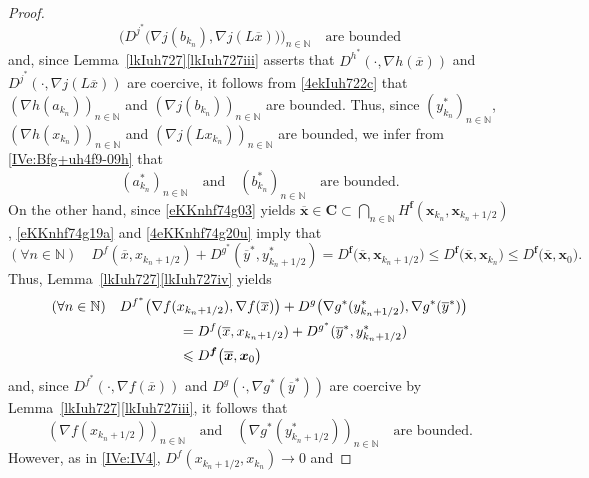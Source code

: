 \documentclass[a4paper,11pt,fleqn]{article}
\renewcommand{\leq}{\ensuremath{\leqslant}}
\newcommand{\NN}{\ensuremath{\mathbb N}}
\theoremstyle{plain}{\theorembodyfont{\rmfamily}%
\newtheorem{conjecture}[theorem]{Conjecture}}
\theoremstyle{plain}{\theorembodyfont{\rmfamily}%
\newtheorem{example}[theorem]{Example}}
\theoremstyle{plain}{\theorembodyfont{\rmfamily}%
\newtheorem{remark}[theorem]{Remark}}
\theoremstyle{plain}{\theorembodyfont{\rmfamily}%
\newtheorem{algorithm}[theorem]{Algorithm}}
\theoremstyle{plain}{\theorembodyfont{\rmfamily}%
\newtheorem{condition}[theorem]{Condition}}
\theoremstyle{plain}{\theorembodyfont{\rmfamily}%
\newtheorem{definition}[theorem]{Definition}}
\theoremstyle{plain}{\theorembodyfont{\rmfamily}
\newtheorem{problem}[theorem]{Problem}}
\theoremstyle{plain}{\theorembodyfont{\rmfamily}
\newtheorem{notation}[theorem]{Notation}}
\numberwithin{equation}{section}
\begin{document}
\begin{proof}
\begin{equation}
\Big(D^{j^*}\big(\nabla j(b_{k_n}),
\nabla j(L\overline{x})\big)\Big)_{n\in\NN}
\quad\text{are bounded}
\end{equation}
and, since Lemma~\ref{lkIuh727}\ref{lkIuh727iii} asserts 
that $D^{h^*}(\cdot,\nabla h(\overline{x}))$ 
and $D^{j^*}(\cdot,\nabla j(L\overline{x}))$ are coercive, 
it follows from \eqref{4ekIuh722c} that 
$(\nabla h(a_{k_n}))_{n\in\NN}$ 
and $(\nabla j(b_{k_n}))_{n\in\NN}$ are bounded. 
Thus, since $(y^*_{k_n})_{n\in\NN}$, $(\nabla h(x_{k_n}))_{n\in\NN}$ 
and $(\nabla j(Lx_{k_n}))_{n\in\NN}$ are bounded, 
we infer from \eqref{IVe:Bfg+uh4f9-09h} that 
\begin{equation}
\label{4ekIuh726a}
(a_{k_n}^*)_{n\in\NN}\quad\text{and}\quad (b_{k_n}^*)_{n\in\NN}
\quad\text{are bounded.}
\end{equation}
On the other hand, since \eqref{eKKnhf74g03} yields
$\overline{\boldsymbol{x}}\in\boldsymbol{C}
\subset\bigcap_{n\in\NN}H^{\boldsymbol{f}}(\boldsymbol{x}_{k_n},
\boldsymbol{x}_{k_n+1/2})$, \eqref{eKKnhf74g19a} and
\eqref{4eKKnhf74g20u} imply that 
\begin{equation}
\label{4ekIuh726d}
(\forall n\in\NN)\quad D^f(\overline{x},x_{k_n+1/2})
+D^{g^*}(\overline{y}^*,y_{k_n+1/2}^*)
=D^{\boldsymbol{f}}\big(\overline{\boldsymbol{x}},
\boldsymbol{x}_{k_n+1/2}\big)
\leq D^{\boldsymbol{f}}\big(\overline{\boldsymbol{x}},
\boldsymbol{x}_{k_n}\big)\leq 
D^{\boldsymbol{f}}\big(\overline{\boldsymbol{x}},
\boldsymbol{x}_0\big).
\end{equation}
Thus, Lemma~\ref{lkIuh727}\ref{lkIuh727iv} yields
\begin{align}
\label{4ekIuh727d}
& (\forall n\in\NN)\quad 
D^{f^*}\big(\nabla f(x_{k_n+1/2}),
\nabla f(\overline{x})\big)+D^g\big(\nabla g^*(y_{k_n+1/2}^*),
\nabla g^*(\overline{y}^*)\big)\nonumber\\
&\hskip 32mm=D^f(\overline{x},x_{k_n+1/2})
+D^{g^*}(\overline{y}^*,y_{k_n+1/2}^*)\nonumber\\
&\hskip 32mm\leq D^{\boldsymbol{f}}\big(\overline{\boldsymbol{x}},
\boldsymbol{x}_0\big)
\end{align}
and, since $D^{f^*}(\cdot,\nabla f(\overline{x}))$ and
$D^g(\cdot,\nabla g^*(\overline{y}^*))$ are coercive by
Lemma~\ref{lkIuh727}\ref{lkIuh727iii}, it follows that
\begin{equation}
\label{4ekIuh724}
(\nabla f(x_{k_n+1/2}))_{n\in\NN}\quad\text{and}\quad
(\nabla g^*(y_{k_n+1/2}^*))_{n\in\NN}
\quad\text{are bounded.}
\end{equation}
However, as in \eqref{IVe:IV4}, 
$D^f(x_{k_n+1/2},x_{k_n})\to 0$ and 

\end{proof}
\end{document}
